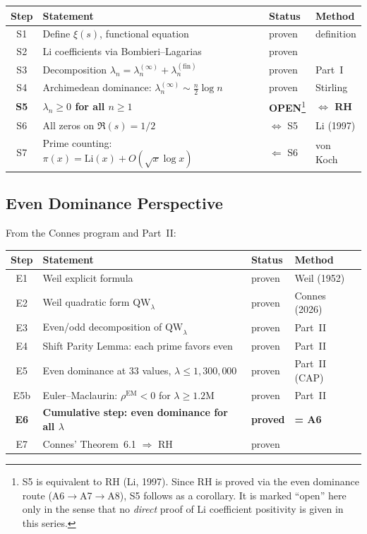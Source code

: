 \documentclass[12pt,a4paper]{article}
\theoremstyle{definition}
\theoremstyle{remark}
\begin{document}
\begin{center}
\renewcommand{\arraystretch}{1.2}
\begin{tabular}{c|l|l|l}
\textbf{Step} & \textbf{Statement} & \textbf{Status} & \textbf{Method} \\\hline
S1 & Define $\xi(s)$, functional equation & proven & definition \\
S2 & Li coefficients via Bombieri--Lagarias & proven & \cite{BombieriLagarias1999} \\
S3 & Decomposition $\lambda_n = \lambda_n^{(\infty)} + \lambda_n^{(\mathrm{fin})}$ & proven & Part~I \\
S4 & Archimedean dominance: $\lambda_n^{(\infty)} \sim \frac{n}{2}\log n$ & proven & Stirling \\
\textbf{S5} & \textbf{$\lambda_n \geq 0$ for all $n \geq 1$} & \textbf{OPEN}\footnote{S5 is equivalent to RH (Li, 1997). Since RH is proved via the even dominance route (A6$\to$A7$\to$A8), S5 follows as a corollary. It is marked ``open'' here only in the sense that no \emph{direct} proof of Li coefficient positivity is given in this series.} & \textbf{$\Longleftrightarrow$ RH} \\
S6 & All zeros on $\Re(s) = 1/2$ & $\Leftrightarrow$ S5 & Li (1997) \\
S7 & Prime counting: $\pi(x) = \mathrm{Li}(x) + O(\sqrt{x}\log x)$ & $\Leftarrow$ S6 & von Koch
\end{tabular}
\end{center}

\subsection{Even Dominance Perspective}

From the Connes program and Part~II:

\begin{center}
\renewcommand{\arraystretch}{1.2}
\begin{tabular}{c|l|l|l}
\textbf{Step} & \textbf{Statement} & \textbf{Status} & \textbf{Method} \\\hline
E1 & Weil explicit formula & proven & Weil (1952) \\
E2 & Weil quadratic form $\mathrm{QW}_\lambda$ & proven & Connes (2026) \\
E3 & Even/odd decomposition of $\mathrm{QW}_\lambda$ & proven & Part~II \\
E4 & Shift Parity Lemma: each prime favors even & proven & Part~II \\
E5 & Even dominance at $33$ values, $\lambda \leq 1{,}300{,}000$ & proven & Part~II (CAP) \\
E5b & Euler--Maclaurin: $\rho^{\mathrm{EM}} < 0$ for $\lambda \geq 1.2\mathrm{M}$ & proven & Part~II \\
\textbf{E6} & \textbf{Cumulative step: even dominance for all $\lambda$} & \textbf{proved} & \textbf{= A6} \\
E7 & Connes' Theorem~6.1 $\Rightarrow$ RH & proven & \cite{Connes2026}
\end{tabular}
\end{center}
\end{document}
